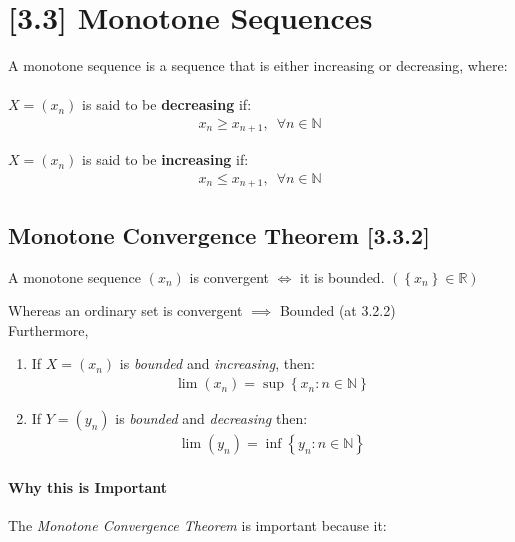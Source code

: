 \documentclass[class=article, crop=false]{standalone}
\begin{document}
\section{[3.3] Monotone Sequences}
A monotone sequence is a sequence that is either increasing or decreasing, where:\\
\ \\
$X = (x_n)$ is said to be \textbf{decreasing} if:
\begin{align}
  x_n \geq x_{n+1}, \enspace  \forall n \in \mathbb{N}
  \label{331dec}
\end{align}

\noindent $X= (x_n)$ is said to be \textbf{increasing} if:
\begin{align}
  x_n \leq x_{n+1}, \enspace  \forall n \in \mathbb{N}
  \label{331inc}
\end{align}

\subsection{Monotone Convergence Theorem [3.3.2]}
A monotone sequence  $\left( x_n \right)$ is convergent $\iff$ it is bounded. {\tiny $\left( \left\{ x_n \right\} \in \mathbb{R} \right)$}

{\footnotesize  Whereas an ordinary set is convergent $\implies$ Bounded (at 3.2.2)} \\

Furthermore,
\begin{enumerate}
\item If $X = (x_n)$ is \textit{bounded} and \textit{increasing}, then:
  \begin{align}
    \lim (x_n) = \sup \left\{ x_n : n \in \mathbb{N} \right\}
    \label{mctboundconinc}
  \end{align}

\item If $Y = (y_n)$ is \textit{bounded} and \textit{decreasing} then:
  \begin{align}
    \lim (y_n) = \inf \left\{ y_n : n \in \mathbb{N} \right\}
    \label{mctboundcondec}
  \end{align}
\end{enumerate}

\paragraph{Why this is Important} The \textit{Monotone Convergence Theorem} is important because it:
\end{document}
